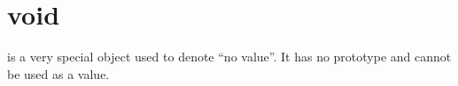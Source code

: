 \section{void}

 is a very special object used to denote ``no value''.  It
has no prototype and cannot be used as a value.

